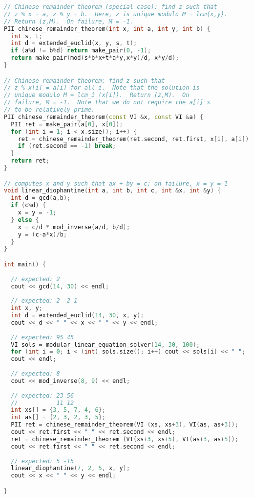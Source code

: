 \begin{lstlisting}[language=C++]
// Chinese remainder theorem (special case): find z such that
// z % x = a, z % y = b.  Here, z is unique modulo M = lcm(x,y).
// Return (z,M).  On failure, M = -1.
PII chinese_remainder_theorem(int x, int a, int y, int b) {
  int s, t;
  int d = extended_euclid(x, y, s, t);
  if (a%d != b%d) return make_pair(0, -1);
  return make_pair(mod(s*b*x+t*a*y,x*y)/d, x*y/d);
}

// Chinese remainder theorem: find z such that
// z % x[i] = a[i] for all i.  Note that the solution is
// unique modulo M = lcm_i (x[i]).  Return (z,M).  On 
// failure, M = -1.  Note that we do not require the a[i]'s
// to be relatively prime.
PII chinese_remainder_theorem(const VI &x, const VI &a) {
  PII ret = make_pair(a[0], x[0]);
  for (int i = 1; i < x.size(); i++) {
    ret = chinese_remainder_theorem(ret.second, ret.first, x[i], a[i]);
    if (ret.second == -1) break;
  }
  return ret;
}

// computes x and y such that ax + by = c; on failure, x = y =-1
void linear_diophantine(int a, int b, int c, int &x, int &y) {
  int d = gcd(a,b);
  if (c%d) {
    x = y = -1;
  } else {
    x = c/d * mod_inverse(a/d, b/d);
    y = (c-a*x)/b;
  }
}

int main() {
  
  // expected: 2
  cout << gcd(14, 30) << endl;
  
  // expected: 2 -2 1
  int x, y;
  int d = extended_euclid(14, 30, x, y);
  cout << d << " " << x << " " << y << endl;
  
  // expected: 95 45
  VI sols = modular_linear_equation_solver(14, 30, 100);
  for (int i = 0; i < (int) sols.size(); i++) cout << sols[i] << " "; 
  cout << endl;
  
  // expected: 8
  cout << mod_inverse(8, 9) << endl;
  
  // expected: 23 56
  //           11 12
  int xs[] = {3, 5, 7, 4, 6};
  int as[] = {2, 3, 2, 3, 5};
  PII ret = chinese_remainder_theorem(VI (xs, xs+3), VI(as, as+3));
  cout << ret.first << " " << ret.second << endl;
  ret = chinese_remainder_theorem (VI(xs+3, xs+5), VI(as+3, as+5));
  cout << ret.first << " " << ret.second << endl;
  
  // expected: 5 -15
  linear_diophantine(7, 2, 5, x, y);
  cout << x << " " << y << endl;

}

\end{lstlisting}
